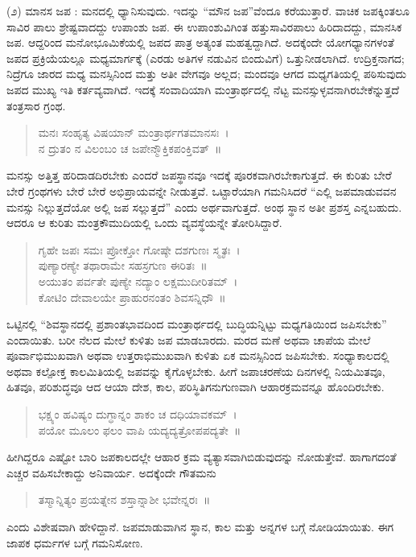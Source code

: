 {(೨) ಮಾನಸ ಜಪ : ಮನದಲ್ಲಿ ಧ್ಯಾನಿಸುವುದು. ಇದನ್ನು “ಮೌನ ಜಪ”ವೆಂದೂ ಕರೆಯುತ್ತಾರೆ. ವಾಚಿಕ ಜಪಕ್ಕಿಂತಲೂ ಸಾವಿರ ಪಾಲು ಶ್ರೇಷ್ಟವಾದದ್ದು ಉಪಾಂಶು ಜಪ. ಈ ಉಪಾಂಶುವಿಗಿಂತ ಹತ್ತುಸಾವಿರಪಾಲು ಹಿರಿದಾದದ್ದು, ಮಾನಸಿಕ ಜಪ. ಆದ್ದರಿಂದ ಮನೋಭೂಮಿಕೆಯಲ್ಲಿ ಜಪದ ಪಾತ್ರ ಅತ್ಯಂತ ಮಹತ್ವದ್ದಾಗಿದೆ. ಅದಕ್ಕೆಂದೇ ಯೋಗಧ್ಯಾನಗಳಂತೆ ಜಪದ ಪ್ರಕ್ರಿಯೆಯಲ್ಲೂ ಮಧ್ಯಮಾರ್ಗಕ್ಕೆ (ಎರಡು ಅತಿಗಳ ನಡುವಿನ ಬಿಂದುವಿಗೆ) ಒತ್ತುನೀಡಲಾಗಿದೆ. ಉದ್ರಿಕ್ತನಾಗದ; ನಿದ್ರೆಗೂ ಜಾರದ ಮಧ್ಯ ಮನಸ್ಸಿನಿಂದ ಮತ್ತು ಅತೀ ವೇಗವೂ ಅಲ್ಲದ; ಮಂದವೂ ಆಗದ ಮಧ್ಯಗತಿಯಲ್ಲಿ ಪಠಿಸುವುದು ಜಪದ ಮುಖ್ಯ ಇತಿ ಕರ್ತವ್ಯವಾಗಿದೆ. ಇದಕ್ಕೆ ಸಂವಾದಿಯಾಗಿ ಮಂತ್ರಾರ್ಥದಲ್ಲಿ ನೆಟ್ಟ ಮನಸ್ಸುಳ್ಳವನಾಗಿರಬೇಕೆನ್ನುತ್ತದೆ ತಂತ್ರಸಾರ ಗ್ರಂಥ.
\begin{verse}
ಮನಃ ಸಂಹೃತ್ಯ ವಿಷಯಾನ್ ಮಂತ್ರಾರ್ಥಗತಮಾನಸಃ~। \\
ನ ದ್ರುತಂ ನ ವಿಲಂಬಂ ಚ ಜಪೇನ್ಮೌಕ್ತಿಕಪಂಕ್ತಿವತ್~॥
\end{verse}
ಮನಸ್ಸು ಅತ್ತಿತ್ತ ಹರಿದಾಡದಿರಬೇಕು ಎಂದರೆ ಜಪಸ್ಥಾನವೂ ಇದಕ್ಕೆ ಪೂರಕವಾಗಿರಬೇಕಾಗುತ್ತದೆ. ಈ ಕುರಿತು ಬೇರೆ ಬೇರೆ ಗ್ರಂಥಗಳು ಬೇರೆ ಬೇರೆ ಅಭಿಪ್ರಾಯವನ್ನೇ ನೀಡುತ್ತವೆ. ಒಟ್ಟಾರೆಯಾಗಿ ಗಮನಿಸಿದರೆ “ಎಲ್ಲಿ ಜಪಮಾಡುವವನ ಮನಸ್ಸು ನಿಲ್ಲುತ್ತದೆಯೋ ಅಲ್ಲಿ ಜಪ ಸಲ್ಲುತ್ತದೆ” ಎಂದು ಅರ್ಥವಾಗುತ್ತದೆ. ಅಂಥ ಸ್ಥಾನ ಅತೀ ಪ್ರಶಸ್ತ ಎನ್ನಬಹುದು. ಆದರೂ ಆ ಕುರಿತು ಮಂತ್ರಕೌಮುದಿಯಲ್ಲಿ ಒಂದು ವ್ಯವಸ್ಥೆಯನ್ನೇ ತೋರಿಸಿದ್ದಾರೆ.
\begin{verse}
ಗೃಹೇ ಜಪಃ ಸಮಃ ಪ್ರೋಕ್ತೋ ಗೋಷ್ಠೇ ದಶಗುಣಃ ಸ್ಮೃತಃ~। \\
ಪುಣ್ಯಾರಣ್ಯೇ ತಥಾರಾಮೇ ಸಹಸ್ರಗುಣ ಈರಿತಃ~॥\\
ಅಯುತಂ ಪರ್ವತೇ ಪುಣ್ಯೇ ನದ್ಯಾಂ ಲಕ್ಷಮುದೀರಿತಮ್~। \\
ಕೋಟಿಂ ದೇವಾಲಯೇ ಪ್ರಾಹುರನಂತಂ ಶಿವಸನ್ನಿಧೌ~॥
\end{verse}
ಒಟ್ಟಿನಲ್ಲಿ “ಶಿವಸ್ಥಾನದಲ್ಲಿ ಪ್ರಶಾಂತಭಾವದಿಂದ ಮಂತ್ರಾರ್ಥದಲ್ಲಿ ಬುದ್ಧಿಯನ್ನಿಟ್ಟು ಮಧ್ಯಗತಿಯಿಂದ ಜಪಿಸಬೇಕು” ಎಂದಾಯಿತು. ಬರೀ ನೆಲದ ಮೇಲೆ ಕುಳಿತು ಜಪ ಮಾಡಬಾರದು. ಮರದ ಮಣೆ ಅಥವಾ ಚಾಪೆಯ ಮೇಲೆ ಪೂರ್ವಾಭಿಮುಖವಾಗಿ ಅಥವಾ ಉತ್ತರಾಭಿಮುಖವಾಗಿ ಕುಳಿತು ಏಕ ಮನಸ್ಸಿನಿಂದ ಜಪಿಸಬೇಕು. ಸಂಧ್ಯಾ\-ಕಾಲದಲ್ಲಿ ಅಥವಾ ಕಲ್ಪೋಕ್ತ ಕಾಲಮಿತಿಯಲ್ಲಿ ಜಪವನ್ನು ಕೈಗೊಳ್ಳಬೇಕು. ಹೀಗೆ ಜಪಾ\-ಚರಣೆಯ ದಿನಗಳಲ್ಲಿ ನಿಯಮಿತವೂ, ಹಿತವೂ, ಪರಿಶುದ್ಧವೂ ಆದ ಆಯಾ ದೇಶ, ಕಾಲ, ಪರಿಸ್ಥಿತಿಗನುಗುಣವಾಗಿ ಆಹಾರಕ್ರಮವನ್ನೂ ಹೊಂದಿರಬೇಕು. 
\begin{verse}
ಭಕ್ಷ್ಯಂ ಹವಿಷ್ಯಂ ದುಗ್ಧಾನ್ನಂ ಶಾಕಂ ಚ ದಧಿಯಾವಕಮ್~। \\
ಪಯೋ ಮೂಲಂ ಫಲಂ ವಾಪಿ ಯದ್ಯದ್ಯತ್ರೋಪಪದ್ಯತೇ~॥
\end{verse}
ಹೀಗಿದ್ದರೂ ಎಷ್ಟೋ ಬಾರಿ ಜಪಕಾಲದಲ್ಲೇ ಆಹಾರ ಕ್ರಮ ವ್ಯತ್ಯಾಸವಾಗಿಬಿಡುವುದನ್ನು ನೋಡುತ್ತೇವೆ. ಹಾಗಾಗದಂತೆ ಎಚ್ಚರ ವಹಿಸಬೇಕಾದ್ದು ಅನಿವಾರ್ಯ. \hbox{ಅದಕ್ಕೆಂದೇ} \hbox{ಗೌತಮನು} \enginline{-}
\begin{verse}
ತಸ್ಮಾನ್ನಿತ್ಯಂ ಪ್ರಯತ್ನೇನ ಶಸ್ತಾನ್ನಾಶೀ ಭವೇನ್ನರಃ~॥
\end{verse}
ಎಂದು ವಿಶೇಷವಾಗಿ ಹೇಳಿದ್ದಾನೆ. ಜಪಮಾಡುವಾಗಿನ ಸ್ಥಾನ, ಕಾಲ ಮತ್ತು ಅನ್ನಗಳ ಬಗ್ಗೆ ನೋಡಿಯಾಯಿತು. ಈಗ ಜಾಪಕ ಧರ್ಮಗಳ ಬಗ್ಗೆ ಗಮನಿಸೋಣ. 
\begin{verse}

\end{verse}}
